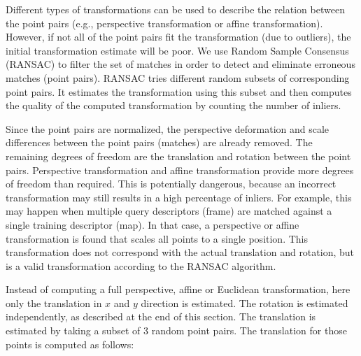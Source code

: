 Different types of transformations can be used to describe the relation between the point pairs (e.g., perspective transformation or affine transformation).
However, if not all of the point pairs fit the transformation (due to outliers), the initial transformation estimate will be poor.
We use Random Sample Consensus (RANSAC) \cite{fischler1981random} to filter the set of matches in order to detect and eliminate erroneous matches (point pairs).
RANSAC tries different random subsets of corresponding point pairs.
It estimates the transformation using this subset and then computes the quality of the computed transformation by counting the number of inliers.

Since the point pairs are normalized,
the perspective deformation and scale differences between the point pairs (matches) are already removed.
The remaining degrees of freedom are the translation and rotation between the point pairs. 
Perspective transformation and affine transformation provide more degrees of freedom than required.
This is potentially dangerous, because an incorrect transformation may still results in a high percentage of inliers.
For example, this may happen when multiple query descriptors (frame) are matched against a single training descriptor (map).
In that case, a perspective or affine transformation is found that scales all points to a single position.
This transformation does not correspond with the actual translation and rotation, but is a valid transformation according to the RANSAC algorithm.

Instead of computing a full perspective, affine or Euclidean transformation, here only the translation in $x$ and $y$ direction is estimated. The rotation is estimated independently, as described at the end of this section.
The translation is estimated by taking a subset of 3 random point pairs.
The translation for those points is computed as follows:

